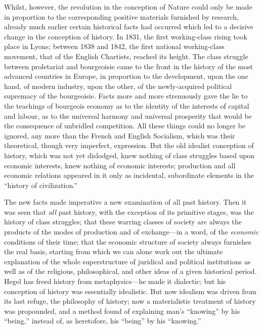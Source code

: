 Whilst, however, the revolution in the conception of Nature could only be made
in proportion to the corresponding positive materials furnished by research,
already much earlier certain historical facts had occurred which led to a
decisive change in the conception of history. In 1831, the first working-class
rising took place in Lyons; between 1838 and 1842, the first national
working-class movement, that of the English Chartists, reached its height. The
class struggle between proletariat and bourgeoisie came to the front in the
history of the most advanced countries in Europe, in proportion to the
development, upon the one hand, of modern industry, upon the other, of the
newly-acquired political supremacy of the bourgeoisie. Facts more and more
strenuously gave the lie to the teachings of bourgeois economy as to the
identity of the interests of capital and labour, as to the universal harmony and
universal prosperity that would be the consequence of unbridled competition. All
these things could no longer be ignored, any more than the French and English
Socialism, which was their theoretical, though very imperfect, expression. But
the old idealist conception of history, which was not yet dislodged, knew
nothing of class struggles based upon economic interests, knew nothing of
economic interests; production and all economic relations appeared in it only as
incidental, subordinate elements in the ``history of civilization.''

The new facts made imperative a new examination of all past history. Then it was
seen that \emph{all} past history, with the exception of its primitive stages,
was the history of class struggles; that these warring classes of society are
always the products of the modes of production and of exchange---in a word, of
the \emph{economic} conditions of their time; that the economic structure of
society always furnishes the real basis, starting from which we can alone work
out the ultimate explanation of the whole superstructure of juridical and
political institutions as well as of the religious, philosophical, and other
ideas of a given historical period. Hegel has freed history from 
metaphysics---he made it dialectic; but his conception of history was
essentially idealistic. But now idealism was driven from its last refuge, the
philosophy of history; now a materialistic treatment of history was propounded,
and a method found of explaining man's ``knowing'' by his ``being,'' instead of,
as heretofore, his ``being'' by his ``knowing.''


